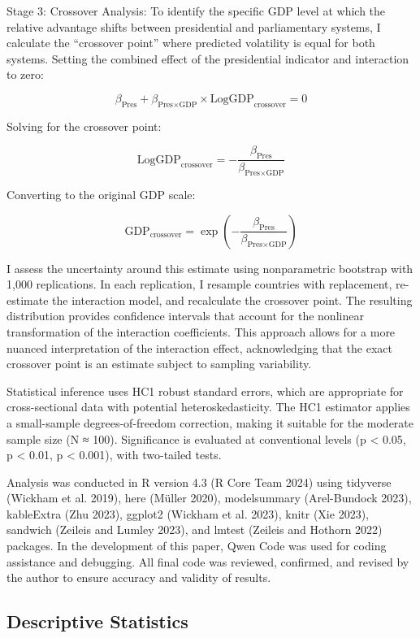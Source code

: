 \documentclass[
  letterpaper,
  DIV=11,
  numbers=noendperiod]{scrartcl}
\begin{document}
Stage 3: Crossover Analysis: To identify the specific GDP level at which
the relative advantage shifts between presidential and parliamentary
systems, I calculate the ``crossover point'' where predicted volatility
is equal for both systems. Setting the combined effect of the
presidential indicator and interaction to zero:

\[
\beta_{\text{Pres}} + \beta_{\text{Pres} \times \text{GDP}} \times \text{LogGDP}_{\text{crossover}} = 0
\]

Solving for the crossover point:

\[
\text{LogGDP}_{\text{crossover}} = -\frac{\beta_{\text{Pres}}}{\beta_{\text{Pres} \times \text{GDP}}}
\]

Converting to the original GDP scale:

\[
\text{GDP}_{\text{crossover}} = \exp\left(-\frac{\beta_{\text{Pres}}}{\beta_{\text{Pres} \times \text{GDP}}}\right)
\]

I assess the uncertainty around this estimate using nonparametric
bootstrap with 1,000 replications. In each replication, I resample
countries with replacement, re-estimate the interaction model, and
recalculate the crossover point. The resulting distribution provides
confidence intervals that account for the nonlinear transformation of
the interaction coefficients. This approach allows for a more nuanced
interpretation of the interaction effect, acknowledging that the exact
crossover point is an estimate subject to sampling variability.

Statistical inference uses HC1 robust standard errors, which are
appropriate for cross-sectional data with potential heteroskedasticity.
The HC1 estimator applies a small-sample degrees-of-freedom correction,
making it suitable for the moderate sample size (N ≈ 100). Significance
is evaluated at conventional levels (p \textless{} 0.05, p \textless{}
0.01, p \textless{} 0.001), with two-tailed tests.

Analysis was conducted in R version 4.3 (R Core Team 2024) using
tidyverse (Wickham et al. 2019), here (Müller 2020), modelsummary
(Arel-Bundock 2023), kableExtra (Zhu 2023), ggplot2 (Wickham et al.
2023), knitr (Xie 2023), sandwich (Zeileis and Lumley 2023), and lmtest
(Zeileis and Hothorn 2022) packages. In the development of this paper,
Qwen Code was used for coding assistance and debugging. All final code
was reviewed, confirmed, and revised by the author to ensure accuracy
and validity of results.

\subsection{Descriptive Statistics}\label{descriptive-statistics}
\end{document}
